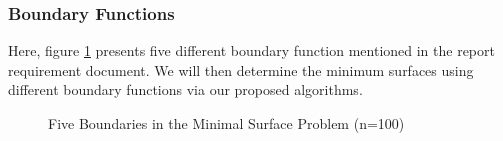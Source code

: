 \subsubsection{Boundary Functions}
Here, figure \ref{fig:boundary} presents five different boundary function mentioned in the report requirement document. We will then determine the minimum surfaces using different boundary functions via our proposed algorithms.
\begin{figure}[!htbp]
    \centering
    \caption{Five Boundaries in the Minimal Surface Problem (n=100)}
    \label{fig:boundary}  
\end{figure}

